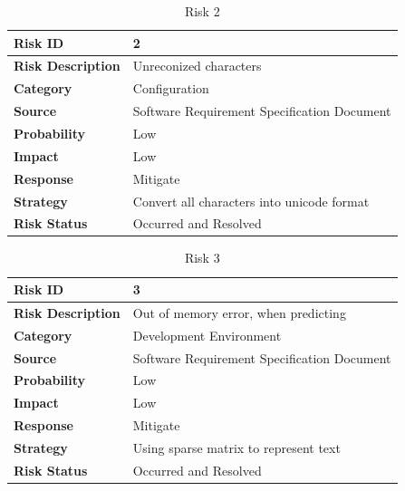 \documentclass[oneside,a4paper,12pt]{pictreport}
\begin{document}
\begin{table}[h!]
\centering
\caption{Risk 2}
\label{my-label}
\begin{tabular}{|l|l|}
\hline
\textbf{Risk ID}          & 2                                                                     \\ \hline
\textbf{Risk Description} & Unreconized characters                                     \\ \hline
\textbf{Category}         & Configuration                                                         \\ \hline
\textbf{Source}           & Software Requirement Specification Document                           \\ \hline
\textbf{Probability}      & Low                                                               \\ \hline
\textbf{Impact}           & Low                                                                \\ \hline
\textbf{Response}         & Mitigate                                                              \\ \hline
\textbf{Strategy}         & Convert all characters into unicode format \\ \hline
\textbf{Risk Status}      & Occurred and Resolved                                                 \\ \hline
\end{tabular}
\end{table}
\begin{table}[h!]
\centering
\caption{Risk 3}
\label{my-label}
\begin{tabular}{|l|l|}
\hline
\textbf{Risk ID}          & 3                                           \\ \hline
\textbf{Risk Description} & Out of memory error, when predicting    \\ \hline
\textbf{Category}         & Development Environment                     \\ \hline
\textbf{Source}           & Software Requirement Specification Document \\ \hline
\textbf{Probability}      & Low                                     \\ \hline
\textbf{Impact}           & Low                                        \\ \hline
\textbf{Response}         & Mitigate                                    \\ \hline
\textbf{Strategy}         & Using sparse matrix to represent text                \\ \hline
\textbf{Risk Status}      & Occurred and Resolved                       \\ \hline
\end{tabular}
\end{table}
\newpage
\end{document}
